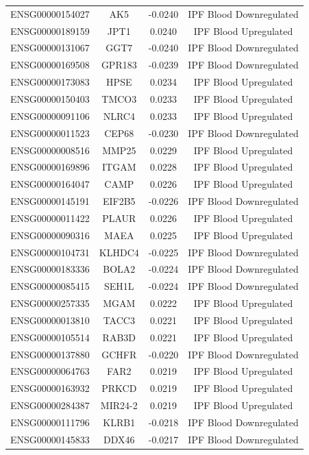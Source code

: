 \documentclass[
]{article}
\begin{document}
\begin{singlespace}
\begin{longtable}[t]{lccc}
ENSG00000154027 & AK5 & -0.0240 & IPF Blood Downregulated\\
ENSG00000189159 & JPT1 & 0.0240 & IPF Blood Upregulated\\
ENSG00000131067 & GGT7 & -0.0240 & IPF Blood Downregulated\\
\addlinespace
ENSG00000169508 & GPR183 & -0.0239 & IPF Blood Downregulated\\
ENSG00000173083 & HPSE & 0.0234 & IPF Blood Upregulated\\
ENSG00000150403 & TMCO3 & 0.0233 & IPF Blood Upregulated\\
ENSG00000091106 & NLRC4 & 0.0233 & IPF Blood Upregulated\\
ENSG00000011523 & CEP68 & -0.0230 & IPF Blood Downregulated\\
\addlinespace
ENSG00000008516 & MMP25 & 0.0229 & IPF Blood Upregulated\\
ENSG00000169896 & ITGAM & 0.0228 & IPF Blood Upregulated\\
ENSG00000164047 & CAMP & 0.0226 & IPF Blood Upregulated\\
ENSG00000145191 & EIF2B5 & -0.0226 & IPF Blood Downregulated\\
ENSG00000011422 & PLAUR & 0.0226 & IPF Blood Upregulated\\
\addlinespace
ENSG00000090316 & MAEA & 0.0225 & IPF Blood Upregulated\\
ENSG00000104731 & KLHDC4 & -0.0225 & IPF Blood Downregulated\\
ENSG00000183336 & BOLA2 & -0.0224 & IPF Blood Downregulated\\
ENSG00000085415 & SEH1L & -0.0224 & IPF Blood Downregulated\\
ENSG00000257335 & MGAM & 0.0222 & IPF Blood Upregulated\\
\addlinespace
ENSG00000013810 & TACC3 & 0.0221 & IPF Blood Upregulated\\
ENSG00000105514 & RAB3D & 0.0221 & IPF Blood Upregulated\\
ENSG00000137880 & GCHFR & -0.0220 & IPF Blood Downregulated\\
ENSG00000064763 & FAR2 & 0.0219 & IPF Blood Upregulated\\
ENSG00000163932 & PRKCD & 0.0219 & IPF Blood Upregulated\\
\addlinespace
ENSG00000284387 & MIR24-2 & 0.0219 & IPF Blood Upregulated\\
ENSG00000111796 & KLRB1 & -0.0218 & IPF Blood Downregulated\\
ENSG00000145833 & DDX46 & -0.0217 & IPF Blood Downregulated\\

\end{longtable}
\end{singlespace}
\end{document}
